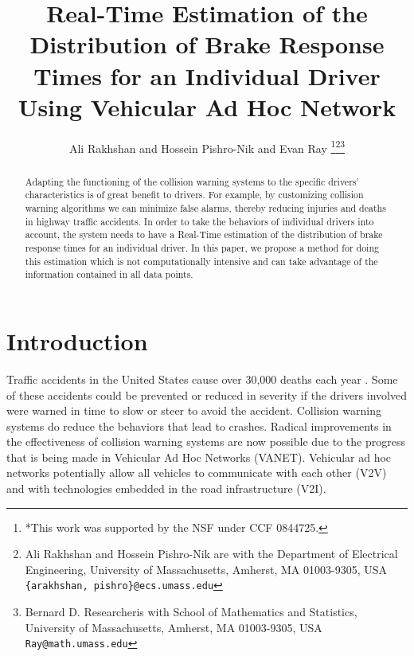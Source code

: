 \documentclass[conference]{IEEEtran}
\begin{document}
\title{\LARGE \bf Real-Time Estimation of the Distribution of Brake Response Times for an Individual Driver Using Vehicular Ad Hoc Network}


\author{Ali Rakhshan and Hossein Pishro-Nik  and Evan Ray \thanks{*This work was supported by the NSF under CCF 0844725.}\thanks{Ali Rakhshan and Hossein Pishro-Nik are with the Department of Electrical Engineering,
        University of Massachusetts, Amherst, MA 01003-9305, USA
        {\tt\small \{arakhshan,  pishro\}@ecs.umass.edu}}\thanks{Bernard D. Researcheris with School of Mathematics and Statistics, University of Massachusetts,
        Amherst, MA 01003-9305, USA
        {\tt\small Ray@math.umass.edu}}}














\maketitle



\maketitle
\thispagestyle{empty}
\pagestyle{empty}


\begin{abstract}
Adapting the functioning of the collision warning systems to the specific drivers' characteristics
is of great benefit to drivers.  For example, by customizing collision warning algorithms we can minimize false alarms, thereby reducing injuries and deaths in highway traffic accidents. In order to take the behaviors of individual drivers into account, the system needs to have a Real-Time estimation of the distribution of brake response times for an individual driver.
In this paper, we propose a method for doing this estimation which is not computationally intensive and can take advantage of the information contained in all data points.
\end{abstract}

\section{Introduction}

Traffic accidents in the United States cause over 30,000 deaths each year \cite{USDoT:TrafficFatalities}.  Some of these accidents could be prevented or reduced in severity if the drivers involved were warned in time to slow or steer to avoid the accident.
Collision warning systems do reduce the behaviors that lead to crashes.
  Radical improvements in the effectiveness of collision warning systems are now possible due to the progress that is being made in Vehicular Ad Hoc Networks (VANET).
  Vehicular ad hoc networks potentially allow all vehicles to communicate with each other (V2V) and with technologies embedded in the road infrastructure (V2I).
\end{document}
